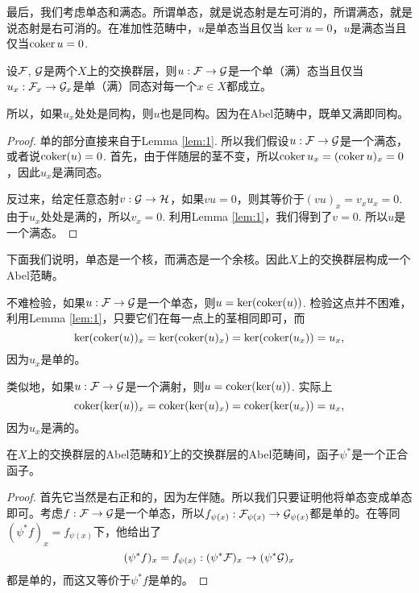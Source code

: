 最后，我们考虑单态和满态。所谓单态，就是说态射是左可消的，所谓满态，就是说态射是右可消的。在准加性范畴中，$u$是单态当且仅当$\ker u=0$，$u$是满态当且仅当$\operatorname{coker} u=0$. 

\begin{lem}
设$\mathcal{F}$, $\mathcal{G}$是两个$X$上的交换群层，则$u:\mathcal{F}\to\mathcal{G}$是一个单（满）态当且仅当$u_x:\mathcal{F}_x\to\mathcal{G}_x$是单（满）同态对每一个$x\in X$都成立。
\end{lem}

所以，如果$u_x$处处是同构，则$u$也是同构。因为在Abel范畴中，既单又满即同构。

\begin{proof}
单的部分直接来自于Lemma \ref{lem:1}. 所以我们假设$u:\mathcal{F}\to\mathcal{G}$是一个满态，或者说$\operatorname{coker}(u)=0$. 首先，由于伴随层的茎不变，所以$\operatorname{coker} u_x=(\operatorname{coker} u)_x=0$，因此$u_x$是满同态。

反过来，给定任意态射$v:\mathcal{G}\to\mathcal{H}$，如果$vu=0$，则其等价于$(vu)_x=v_xu_x=0$. 由于$u_x$处处是满的，所以$v_x=0$. 利用Lemma \ref{lem:1}，我们得到了$v=0$. 所以$u$是一个满态。
\end{proof}

\begin{para}
下面我们说明，单态是一个核，而满态是一个余核。因此$X$上的交换群层构成一个Abel范畴。

不难检验，如果$u:\mathcal{F}\to\mathcal{G}$是一个单态，则$u=\ker(\operatorname{coker}(u))$. 检验这点并不困难，利用Lemma \ref{lem:1}，只要它们在每一点上的茎相同即可，而
\[
	\ker(\operatorname{coker}(u))_x=\ker(\operatorname{coker}(u)_x)=\ker(\operatorname{coker}(u_x))=u_x,
\]
因为$u_x$是单的。

类似地，如果$u:\mathcal{F}\to \mathcal{G}$是一个满射，则$u=\operatorname{coker} (\ker(u))$. 实际上
\[
	\operatorname{coker} (\ker(u))_x=\operatorname{coker}(\ker(u)_x)=\operatorname{coker}(\ker(u_x))=u_x,
\]
因为$u_x$是满的。
\end{para}

\begin{pro}
在$X$上的交换群层的Abel范畴和$Y$上的交换群层的Abel范畴间，函子$\psi^*$是一个正合函子。
\end{pro}

\begin{proof}
首先它当然是右正和的，因为左伴随。所以我们只要证明他将单态变成单态即可。考虑$f:\mathcal{F} \to \mathcal{G}$是一个单态，所以$f_{\psi(x)}:\mathcal{F}_{\psi(x)} \to \mathcal{G}_{\psi(x)}$都是单的。在等同$(\psi^* f)_x=f_{\psi(x)}$下，他给出了
\[
	(\psi^* f)_x=f_{\psi(x)}:(\psi^*\mathcal{F})_{x} \to (\psi^*\mathcal{G})_{x}
\]
都是单的，而这又等价于$\psi^* f$是单的。
\end{proof}


